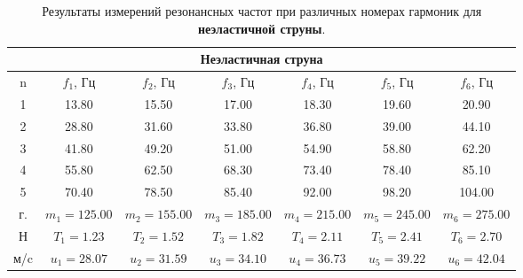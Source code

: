 \documentclass[12pt, a4paper]{article}
\begin{document}
\begin{table}[H]
\begin{center}
\begin{tabular}{|c|c|c|c|c|c|c|}
\hline 
\multicolumn{7}{|c|}{Неэластичная струна}\\ 
\hline 
n & $f_1$, Гц & $f_2$, Гц & $f_3$, Гц & $f_4$, Гц & $f_5$, Гц & $f_6$, Гц\\ 
\hline 
1 & 13.80 & 15.50 & 17.00 & 18.30 & 19.60 & 20.90\\ 
\hline 
2 & 28.80 & 31.60 & 33.80 & 36.80 & 39.00 & 44.10\\ 
\hline 
3 & 41.80 & 49.20 & 51.00 & 54.90 & 58.80 & 62.20\\ 
\hline 
4 & 55.80 & 62.50 & 68.30 & 73.40 & 78.40 & 85.10\\ 
\hline 
5 & 70.40 & 78.50 & 85.40 & 92.00 & 98.20 & 104.00\\ 
\hline 
г. & $m_1 = 125.00$ & $m_2 = 155.00$ & $m_3 = 185.00$ & $m_4 = 215.00$ & $m_5 = 245.00$ & $m_6 = 275.00$\\ 
\hline 
Н & $T_1 = 1.23$ & $T_2 = 1.52$ & $T_3 = 1.82$ & $T_4 = 2.11$ & $T_5 = 2.41$ & $T_6 = 2.70$\\ 
\hline 
м/c & $u_1 = 28.07$ & $u_2 = 31.59$ & $u_3 = 34.10$ & $u_4 = 36.73$ & $u_5 = 39.22$ & $u_6 = 42.04$\\ 
\hline 

\end{tabular}
\caption{Результаты измерений резонансных частот при различных номерах гармоник для \textbf{неэластичной струны}.}
\label{tab:3}
\end{center}
\end{table}
\end{document}
